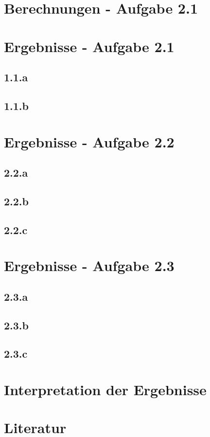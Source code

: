 \documentclass[a4paper,12pt]{article}
\begin{document}
	\section{Berechnungen - Aufgabe 2.1}
	
	\section{Ergebnisse - Aufgabe 2.1}
	\subsection{1.1.a}
	
	\subsection{1.1.b}

	\section{Ergebnisse - Aufgabe 2.2}
	\subsection{2.2.a}
	
	\subsection{2.2.b}
	
	\subsection{2.2.c}
	
	\section{Ergebnisse - Aufgabe 2.3}
	\subsection{2.3.a}
	
	\subsection{2.3.b}
	
	\subsection{2.3.c}	
	
	\section{Interpretation der Ergebnisse}
	
	\section{Literatur}
\end{document}
